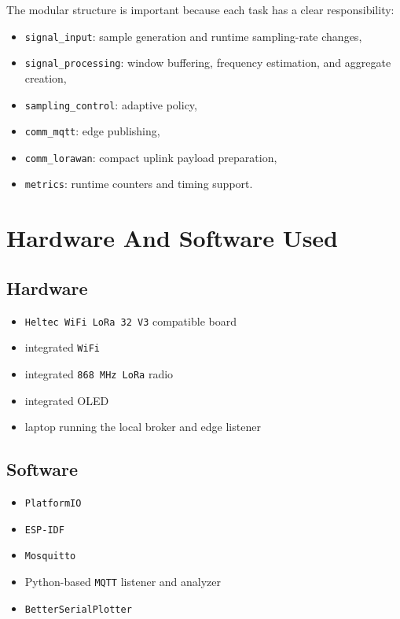 \documentclass[12pt,a4paper]{article}
\begin{document}
The modular structure is important because each task has a clear
responsibility:

\begin{itemize}
    \item \texttt{signal\_input}: sample generation and runtime sampling-rate changes,
    \item \texttt{signal\_processing}: window buffering, frequency estimation, and aggregate creation,
    \item \texttt{sampling\_control}: adaptive policy,
    \item \texttt{comm\_mqtt}: edge publishing,
    \item \texttt{comm\_lorawan}: compact uplink payload preparation,
    \item \texttt{metrics}: runtime counters and timing support.
\end{itemize}

\section{Hardware And Software Used}

\subsection{Hardware}

\begin{itemize}
    \item \texttt{Heltec WiFi LoRa 32 V3} compatible board
    \item integrated \texttt{WiFi}
    \item integrated \texttt{868 MHz LoRa} radio
    \item integrated OLED
    \item laptop running the local broker and edge listener
\end{itemize}

\subsection{Software}

\begin{itemize}
    \item \texttt{PlatformIO}
    \item \texttt{ESP-IDF}
    \item \texttt{Mosquitto}
    \item Python-based \texttt{MQTT} listener and analyzer
    \item \texttt{BetterSerialPlotter}
\end{itemize}
\end{document}
